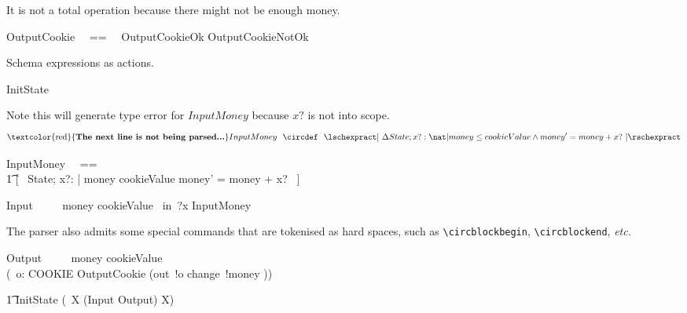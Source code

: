 \documentclass{article}
\begin{document}
It is not a total operation because there might not be enough money.
%
\begin{zed}
   OutputCookie ~~==~~ OutputCookieOk \lor OutputCookieNotOk
\end{zed}

Schema expressions as actions.
%
\begin{circusaction}
    InitState ~~\circdef~~ \lschexpract [~ State~' | money' = 0 \land quantity' = cookieQuantity ~] \rschexpract
\end{circusaction}

Note this will generate type error for $InputMoney$ because $x?$ is not into scope.
%
\[
\mbox{\textcolor{red}{\textbf{The next line is not being parsed...}}} \\
    InputMoney ~~\circdef~~ \lschexpract [~ \Delta State; x?: \nat | money \leq cookieValue \land money' = money + x? ~] \rschexpract
\]
%
\begin{zed}
    InputMoney ~~==~~ \\
        \t1 [~ \Delta State; x?: \nat | money \leq cookieValue \land money' = money + x? ~]
\end{zed}

\begin{circusaction}
   Input ~~\circdef~~ \lcircguard money \leq cookieValue \rcircguard  \circguard\ in~?x \then \lschexpract InputMoney \rschexpract \\
\end{circusaction}

The parser also admits some special commands that are tokenised as hard spaces, such as \verb'\circblockbegin', \verb'\circblockend', \textit{etc.}
%
\begin{circusaction}
    Output ~~\circdef~~
        \circblockbegin
            \lcircguard money \geq cookieValue \rcircguard \circguard\ \\
            (\circvar\ o: COOKIE \circspot \lschexpract OutputCookie \rschexpract \circseq (out~!o \then change~!money \then \Skip))
        \circblockend
\end{circusaction}

\begin{circusaction}
   \t1 \circspot InitState \circseq (\circmu\ X \circspot (Input \extchoice Output) \circseq X)
\end{circusaction}

\begin{circus}
   \circend
\end{circus}
\end{document}
